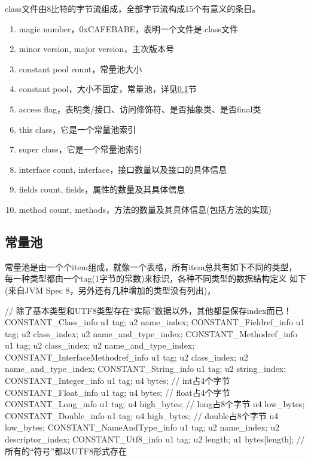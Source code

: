 \documentclass[a4paper,11pt]{article}
\begin{document}
class文件由8比特的字节流组成，全部字节流构成15个有意义的条目。
\begin{enumerate}
  \item magic number，0xCAFEBABE，表明一个文件是.class文件
  \item minor version, major version，主次版本号
  \item constant pool count，常量池大小
  \item constant pool，大小不固定，常量池，详见\ref{sec:constantpool}节
  \item access flag，表明类/接口、访问修饰符、是否抽象类、是否final类
  \item this class，它是一个常量池索引
  \item super class，它是一个常量池索引
  \item interface count, interface，接口数量以及接口的具体信息
  \item fields count, fields，属性的数量及其具体信息
  \item method count, methods，方法的数量及其具体信息(包括方法的实现)
\end{enumerate}

\subsection[常量池]{常量池}
\label{sec:constantpool}
常量池是由一个个item组成，就像一个表格，所有item总共有如下不同的类型，
每一种类型都由一个tag(1字节的常数)来标识，各种不同类型的数据结构定义
如下(来自JVM Spec 8，另外还有几种增加的类型没有列出)，

\begin{javacode}
// 除了基本类型和UTF8类型存在“实际”数据以外，其他都是保存index而已！
CONSTANT_Class_info {
  u1 tag;
  u2 name_index;
}
CONSTANT_Fieldref_info {
  u1 tag;
  u2 class_index;
  u2 name_and_type_index;
}
CONSTANT_Methodref_info {
  u1 tag;
  u2 class_index;
  u2 name_and_type_index;
}
CONSTANT_InterfaceMethodref_info {
  u1 tag;
  u2 class_index;
  u2 name_and_type_index;
}
CONSTANT_String_info {
  u1 tag;
  u2 string_index;
}
CONSTANT_Integer_info {
  u1 tag;
  u4 bytes; // int占4个字节
}
CONSTANT_Float_info {
  u1 tag;
  u4 bytes; // float占4个字节
}
CONSTANT_Long_info {
  u1 tag;
  u4 high_bytes; // long占8个字节
  u4 low_bytes;
}
CONSTANT_Double_info {
  u1 tag;
  u4 high_bytes; // double占8个字节
  u4 low_bytes;
}
CONSTANT_NameAndType_info {
  u1 tag;
  u2 name_index;
  u2 descriptor_index;
}
CONSTANT_Utf8_info {
  u1 tag;
  u2 length;
  u1 bytes[length]; // 所有的“符号”都以UTF8形式存在
}
\end{javacode}
\end{document}
